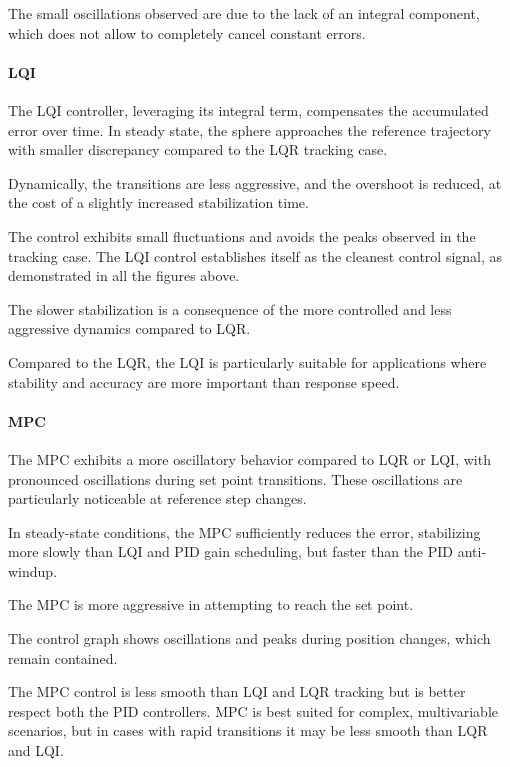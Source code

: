 The small oscillations observed are due to the lack of an integral component, which does not allow to completely cancel constant errors.

\paragraph{LQI}

The LQI controller, leveraging its integral term, compensates the accumulated error over time.
In steady state, the sphere approaches the reference trajectory with smaller discrepancy compared to the LQR tracking case.

Dynamically, the transitions are less aggressive, and the overshoot is reduced, at the cost of a slightly increased stabilization time.

The control exhibits small fluctuations and avoids the peaks observed in the tracking case.
The LQI control establishes itself as the cleanest control signal, as demonstrated in all the figures above.

The slower stabilization is a consequence of the more controlled and less aggressive dynamics compared to LQR.

Compared to the LQR, the LQI is particularly suitable for applications where stability and accuracy are more important than response speed.

\paragraph{MPC}

The MPC exhibits a more oscillatory behavior compared to LQR or LQI, with pronounced oscillations during set point transitions.
These oscillations are particularly noticeable at reference step changes.

In steady-state conditions, the MPC sufficiently reduces the error, stabilizing more slowly than LQI and PID gain scheduling, but faster than the PID anti-windup.

The MPC is more aggressive in attempting to reach the set point.

The control graph shows oscillations and peaks during position changes, which remain contained.

The MPC control is less smooth than LQI and LQR tracking but is better respect both the PID controllers.
MPC is best suited for complex, multivariable scenarios, but in cases with rapid transitions it may be less smooth than LQR and LQI.



